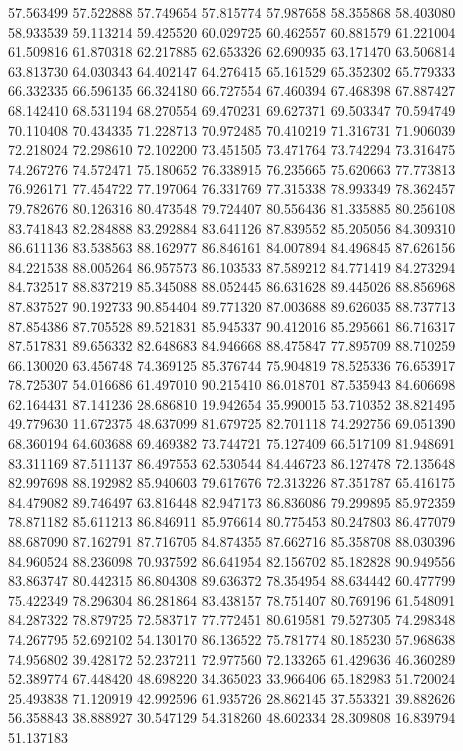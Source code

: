 57.563499
57.522888
57.749654
57.815774
57.987658
58.355868
58.403080
58.933539
59.113214
59.425520
60.029725
60.462557
60.881579
61.221004
61.509816
61.870318
62.217885
62.653326
62.690935
63.171470
63.506814
63.813730
64.030343
64.402147
64.276415
65.161529
65.352302
65.779333
66.332335
66.596135
66.324180
66.727554
67.460394
67.468398
67.887427
68.142410
68.531194
68.270554
69.470231
69.627371
69.503347
70.594749
70.110408
70.434335
71.228713
70.972485
70.410219
71.316731
71.906039
72.218024
72.298610
72.102200
73.451505
73.471764
73.742294
73.316475
74.267276
74.572471
75.180652
76.338915
76.235665
75.620663
77.773813
76.926171
77.454722
77.197064
76.331769
77.315338
78.993349
78.362457
79.782676
80.126316
80.473548
79.724407
80.556436
81.335885
80.256108
83.741843
82.284888
83.292884
83.641126
87.839552
85.205056
84.309310
86.611136
83.538563
88.162977
86.846161
84.007894
84.496845
87.626156
84.221538
88.005264
86.957573
86.103533
87.589212
84.771419
84.273294
84.732517
88.837219
85.345088
88.052445
86.631628
89.445026
88.856968
87.837527
90.192733
90.854404
89.771320
87.003688
89.626035
88.737713
87.854386
87.705528
89.521831
85.945337
90.412016
85.295661
86.716317
87.517831
89.656332
82.648683
84.946668
88.475847
77.895709
88.710259
66.130020
63.456748
74.369125
85.376744
75.904819
78.525336
76.653917
78.725307
54.016686
61.497010
90.215410
86.018701
87.535943
84.606698
62.164431
87.141236
28.686810
19.942654
35.990015
53.710352
38.821495
49.779630
11.672375
48.637099
81.679725
82.701118
74.292756
69.051390
68.360194
64.603688
69.469382
73.744721
75.127409
66.517109
81.948691
83.311169
87.511137
86.497553
62.530544
84.446723
86.127478
72.135648
82.997698
88.192982
85.940603
79.617676
72.313226
87.351787
65.416175
84.479082
89.746497
63.816448
82.947173
86.836086
79.299895
85.972359
78.871182
85.611213
86.846911
85.976614
80.775453
80.247803
86.477079
88.687090
87.162791
87.716705
84.874355
87.662716
85.358708
88.030396
84.960524
88.236098
70.937592
86.641954
82.156702
85.182828
90.949556
83.863747
80.442315
86.804308
89.636372
78.354954
88.634442
60.477799
75.422349
78.296304
86.281864
83.438157
78.751407
80.769196
61.548091
84.287322
78.879725
72.583717
77.772451
80.619581
79.527305
74.298348
74.267795
52.692102
54.130170
86.136522
75.781774
80.185230
57.968638
74.956802
39.428172
52.237211
72.977560
72.133265
61.429636
46.360289
52.389774
67.448420
48.698220
34.365023
33.966406
65.182983
51.720024
25.493838
71.120919
42.992596
61.935726
28.862145
37.553321
39.882626
56.358843
38.888927
30.547129
54.318260
48.602334
28.309808
16.839794
51.137183
